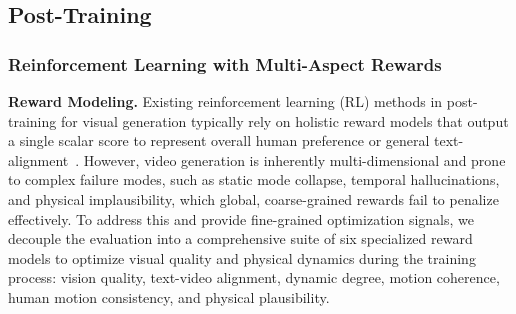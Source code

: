 \subsection{Post-Training}
\subsubsection{Reinforcement Learning with Multi-Aspect Rewards}
\label{sec:training:reward}
\noindent \textbf{Reward Modeling.} 
Existing reinforcement learning (RL) methods in post-training for visual generation typically rely on holistic reward models that output a single scalar score to represent overall human preference or general text-alignment~\cite{xu2023imagereward,kirstain2023pickscore,tang2026enhancing}.
However, video generation is inherently multi-dimensional and prone to complex failure modes, such as static mode collapse, temporal hallucinations, and physical implausibility, which global, coarse-grained rewards fail to penalize effectively.
To address this and provide fine-grained optimization signals, we decouple the evaluation into a comprehensive suite of six specialized reward models to optimize visual quality and physical dynamics during the training process: vision quality, text-video alignment, dynamic degree, motion coherence, human motion consistency, and physical plausibility.
